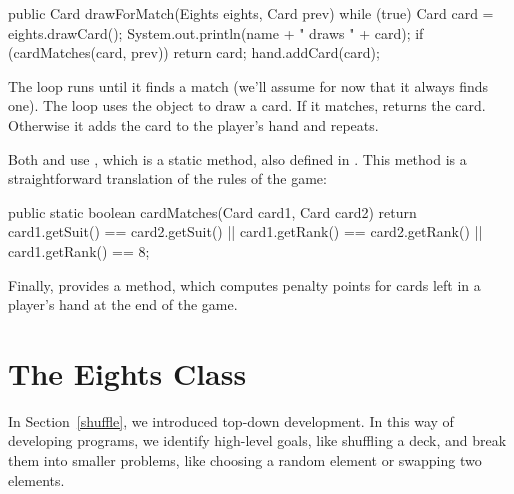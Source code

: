 \begin{code}
public Card drawForMatch(Eights eights, Card prev) {
    while (true) {
        Card card = eights.drawCard();
        System.out.println(name + " draws " + card);
        if (cardMatches(card, prev)) {
            return card;
        }
        hand.addCard(card);
    }
}
\end{code}

The  loop runs until it finds a match (we'll assume for now that it always finds one).
The loop uses the  object to draw a card.
If it matches,  returns the card.
Otherwise it adds the card to the player's hand and repeats.

Both  and  use , which is a static method, also defined in .
This method is a straightforward translation of the rules of the game:

\begin{code}
public static boolean cardMatches(Card card1, Card card2) {
    return card1.getSuit() == card2.getSuit()
        || card1.getRank() == card2.getRank()
        || card1.getRank() == 8;
}
\end{code}

Finally,  provides a  method, which computes penalty points for cards left in a player's hand at the end of the game.



\section{The Eights Class}


In Section~\ref{shuffle}, we introduced top-down development. In this way of developing programs, we identify high-level goals, like shuffling a deck, and break them into smaller problems, like choosing a random element or swapping two elements.


